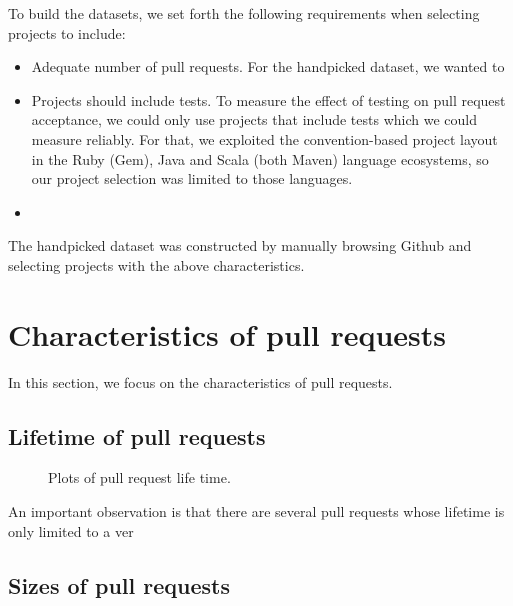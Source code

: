 \documentclass{sig-alternate}
\begin{document}
To build the datasets, we set forth the following requirements when selecting
projects to include:

\begin{itemize}

  \item Adequate number of pull requests. For the \textsf{handpicked} dataset,
    we wanted to 

  \item Projects should include tests. To measure the effect of testing on pull
    request acceptance, we could only use projects that include tests which we
    could measure reliably. For that, we exploited the convention-based project
    layout in the Ruby (Gem), Java and Scala (both Maven) language ecosystems,
    so our project selection was limited to those languages. 

  \item  

\end{itemize}

The \textsf{handpicked} dataset was constructed by manually browsing Github
and selecting projects with the above characteristics.  

\section{Characteristics of pull requests}
In this section, we focus on the characteristics of pull requests. 

\subsection{Lifetime of pull requests}

\begin{figure*}
\centering
{}
\caption{Plots of pull request life time.}
\end{figure*}


An important observation is that there are several pull requests whose
lifetime is only limited to a ver

\subsection{Sizes of pull requests}
\end{document}

